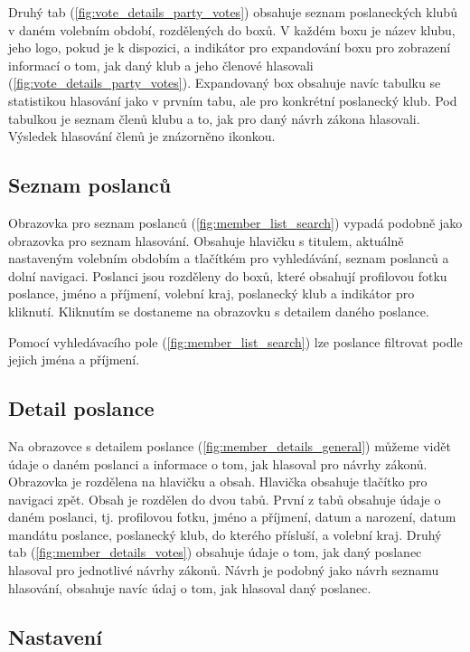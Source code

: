 Druhý tab (\ref{fig:vote_details_party_votes}) obsahuje seznam poslaneckých klubů v daném volebním období, rozdělených do boxů. V každém boxu je název klubu, jeho logo, pokud je k dispozici, a indikátor pro expandování boxu pro zobrazení informací o tom, jak daný klub a jeho členové hlasovali (\ref{fig:vote_details_party_votes}). Expandovaný box obsahuje navíc tabulku se statistikou hlasování jako v prvním tabu, ale pro konkrétní poslanecký klub. Pod tabulkou je seznam členů klubu a to, jak pro daný návrh zákona hlasovali. Výsledek hlasování členů je znázorněno ikonkou.

\subsection*{Seznam poslanců}

Obrazovka pro seznam poslanců (\ref{fig:member_list_search}) vypadá podobně jako obrazovka pro seznam hlasování. Obsahuje hlavičku s titulem, aktuálně nastaveným volebním obdobím a tlačítkém pro vyhledávání, seznam poslanců a dolní navigaci. Poslanci jsou rozděleny do boxů, které obsahují profilovou fotku poslance, jméno a příjmení, volební kraj, poslanecký klub a indikátor pro kliknutí. Kliknutím se dostaneme na obrazovku s detailem daného poslance. 

Pomocí vyhledávacího pole (\ref{fig:member_list_search}) lze poslance filtrovat podle jejich jména a příjmení.

\subsection*{Detail poslance}

Na obrazovce s detailem poslance (\ref{fig:member_details_general}) můžeme vidět údaje o daném poslanci a informace o tom, jak hlasoval pro návrhy zákonů. Obrazovka je rozdělena na hlavičku a obsah. Hlavička obsahuje tlačítko pro navigaci zpět. Obsah je rozdělen do dvou tabů. První z tabů obsahuje údaje o daném poslanci, tj. profilovou fotku, jméno a příjmení, datum a narození, datum mandátu poslance, poslanecký klub, do kterého přísluší, a volební kraj. Druhý tab (\ref{fig:member_details_votes}) obsahuje údaje o tom, jak daný poslanec hlasoval pro jednotlivé návrhy zákonů. Návrh je podobný jako návrh seznamu hlasování, obsahuje navíc údaj o tom, jak hlasoval daný poslanec.

\subsection*{Nastavení}
	
